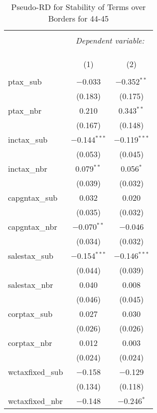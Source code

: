 
\begin{table}[!htbp] \centering 
  \caption{Pseudo-RD for Stability of Terms over Borders for  44-45} 
  \label{} 
\begin{tabular}{@{\extracolsep{5pt}}lcc} 
\\[-1.8ex]\hline 
\hline \\[-1.8ex] 
 & \multicolumn{2}{c}{\textit{Dependent variable:}} \\ 
\cline{2-3} 
\\[-1.8ex] & \multicolumn{2}{c}{ } \\ 
\\[-1.8ex] & (1) & (2)\\ 
\hline \\[-1.8ex] 
 ptax\_sub & $-$0.033 & $-$0.352$^{**}$ \\ 
  & (0.183) & (0.175) \\ 
  ptax\_nbr & 0.210 & 0.343$^{**}$ \\ 
  & (0.167) & (0.148) \\ 
  inctax\_sub & $-$0.144$^{***}$ & $-$0.119$^{***}$ \\ 
  & (0.053) & (0.045) \\ 
  inctax\_nbr & 0.079$^{**}$ & 0.056$^{*}$ \\ 
  & (0.039) & (0.032) \\ 
  capgntax\_sub & 0.032 & 0.020 \\ 
  & (0.035) & (0.032) \\ 
  capgntax\_nbr & $-$0.070$^{**}$ & $-$0.046 \\ 
  & (0.034) & (0.032) \\ 
  salestax\_sub & $-$0.154$^{***}$ & $-$0.146$^{***}$ \\ 
  & (0.044) & (0.039) \\ 
  salestax\_nbr & 0.040 & 0.008 \\ 
  & (0.046) & (0.045) \\ 
  corptax\_sub & 0.027 & 0.030 \\ 
  & (0.026) & (0.026) \\ 
  corptax\_nbr & 0.012 & 0.003 \\ 
  & (0.024) & (0.024) \\ 
  wctaxfixed\_sub & $-$0.158 & $-$0.129 \\ 
  & (0.134) & (0.118) \\ 
  wctaxfixed\_nbr & $-$0.148 & $-$0.246$^{*}$ \\ 

\end{tabular}
\end{table}
